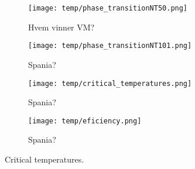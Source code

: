 \begin{figure*}[!ht]
    \texttt{[image: temp/phase\_transitionNT50.png]} 
    \caption{Hvem vinner VM?}
    \label{fig:phase_transition}
\end{figure*} 

\begin{figure}[!ht]
    \texttt{[image: temp/phase\_transitionNT101.png]} 
    \caption{Spania?}
    \label{fig:phase_transition_zoomed}
\end{figure} 

\begin{figure}[!ht]
    \texttt{[image: temp/critical\_temperatures.png]} 
    \caption{Spania?}
    \label{fig:critical_temperatures}
\end{figure} 

\begin{figure}[!ht]
    \texttt{[image: temp/eficiency.png]} 
    \caption{Spania?}
    \label{fig:efficiency}
\end{figure} 





\begin{table}[!ht]
    
    \caption{Critical temperatures.}
    \label{tab:critical_temperatures}
\end{table}

